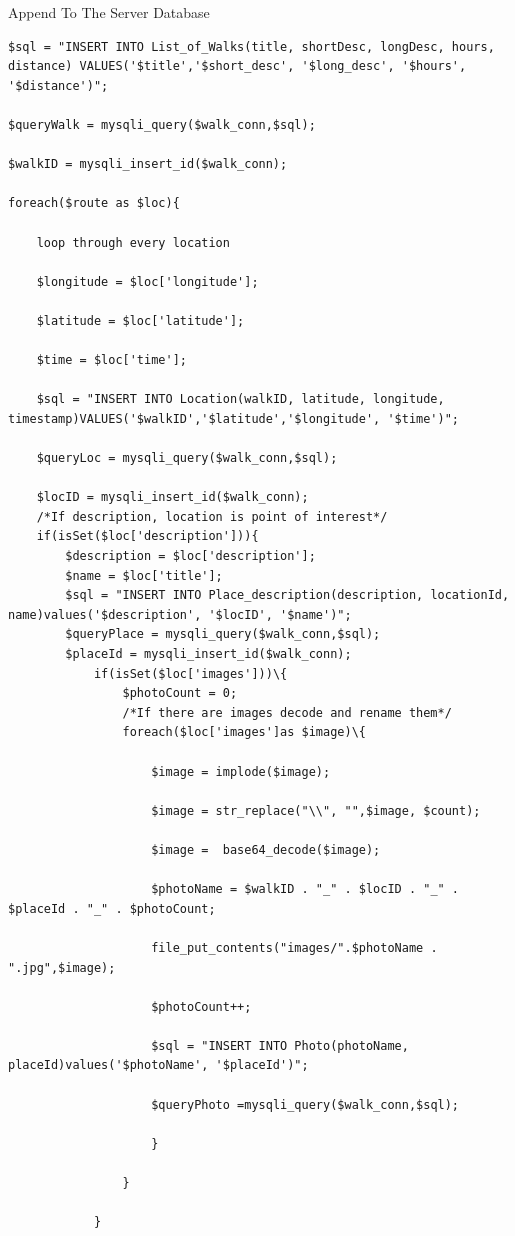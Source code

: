 \documentclass[12pt]{article}
\makeatletter
\renewcommand{\paragraph}{
  \@startsection{paragraph}{4}
  {\z@}{3.25ex \@plus -10em \@minus 1em}{0.1em}
  {\normalfont\normalsize\bfseries}
}
\makeatother
\begin{document}
\paragraph{Append To The Server Database}
\begin{adjustwidth}{-3cm}{-3cm}
\begin{lstlisting}
$sql = "INSERT INTO List_of_Walks(title, shortDesc, longDesc, hours, distance) VALUES('$title','$short_desc', '$long_desc', '$hours', '$distance')"; 

$queryWalk = mysqli_query($walk_conn,$sql);
    
$walkID = mysqli_insert_id($walk_conn);	
		
foreach($route as $loc){
       
	loop through every location
			
	$longitude = $loc['longitude'];
            
	$latitude = $loc['latitude'];
            
	$time = $loc['time'];
			
	$sql = "INSERT INTO Location(walkID, latitude, longitude, timestamp)VALUES('$walkID','$latitude','$longitude', '$time')";
            
	$queryLoc = mysqli_query($walk_conn,$sql);
        
	$locID = mysqli_insert_id($walk_conn);
	/*If description, location is point of interest*/
	if(isSet($loc['description'])){			
		$description = $loc['description'];
		$name = $loc['title'];
		$sql = "INSERT INTO Place_description(description, locationId, name)values('$description', '$locID', '$name')";
		$queryPlace = mysqli_query($walk_conn,$sql);
		$placeId = mysqli_insert_id($walk_conn);
			if(isSet($loc['images']))\{
				$photoCount = 0;
				/*If there are images decode and rename them*/
				foreach($loc['images']as $image)\{
				
					$image = implode($image);
						
					$image = str_replace("\\", "",$image, $count);
						
					$image =  base64_decode($image);
						
					$photoName = $walkID . "_" . $locID . "_" . $placeId . "_" . $photoCount;
						
					file_put_contents("images/".$photoName . ".jpg",$image);
						
					$photoCount++;
						
					$sql = "INSERT INTO Photo(photoName, placeId)values('$photoName', '$placeId')";
						
					$queryPhoto =mysqli_query($walk_conn,$sql);
						
					}
					
				}
				
			}
\end{lstlisting}
\end{adjustwidth}
\end{document}
